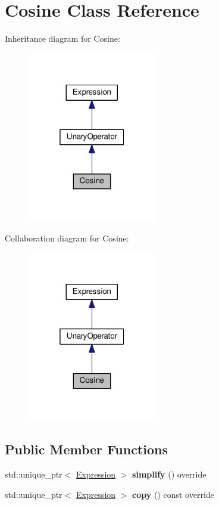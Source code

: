 \hypertarget{classCosine}{}\section{Cosine Class Reference}
\label{classCosine}


Inheritance diagram for Cosine\+:\nopagebreak
\begin{figure}[H]
\begin{center}
\leavevmode
\includegraphics[width=160pt]{classCosine__inherit__graph}
\end{center}
\end{figure}


Collaboration diagram for Cosine\+:\nopagebreak
\begin{figure}[H]
\begin{center}
\leavevmode
\includegraphics[width=160pt]{classCosine__coll__graph}
\end{center}
\end{figure}
\subsection*{Public Member Functions}
\begin{DoxyCompactItemize}
\item 
std\+::unique\+\_\+ptr$<$ \hyperlink{classExpression}{Expression} $>$ {\bfseries simplify} () override\hypertarget{classCosine_a4384c858bbbd1491b2ee4bb195da65d5}{}\label{classCosine_a4384c858bbbd1491b2ee4bb195da65d5}

\item 
std\+::unique\+\_\+ptr$<$ \hyperlink{classExpression}{Expression} $>$ {\bfseries copy} () const override\hypertarget{classCosine_abf1ce0397768dbb60a2b267490fa0358}{}\label{classCosine_abf1ce0397768dbb60a2b267490fa0358}

\end{DoxyCompactItemize}
